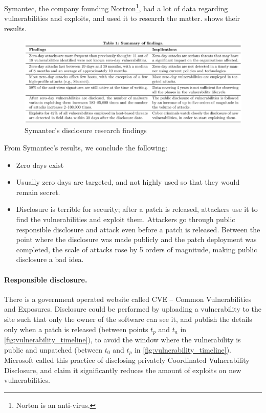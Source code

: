 Symantec, the company founding Nortron\footnote{Norton is an anti-virus.}, had a lot of data regarding vulnerabilities and exploits, and used it to research the matter.  shows their results.

\begin{figure}[!ht]
    \centering
    \includegraphics[width=\textwidth]{images/Disclosure_Research_Findings.PNG}
    \caption{Symantec's disclosure research findings}
    \label{fig:disclosure_research_findings}
\end{figure}


From Symantec's results, we conclude the following:


\begin{itemize}
    \item Zero days exist
    \item Usually zero days are targeted, and not highly used so that they would remain secret.
    \item Disclosure is terrible for security; after a patch is released, attackers use it to find the vulnerabilities and exploit them. Attackers go through public responsible disclosure and attack even before a patch is released. Between the point where the disclosure was made publicly and the patch deployment was completed, the scale of attacks rose by 5 orders of magnitude, making public disclosure a bad idea.
\end{itemize}


\paragraph{Responsible disclosure.} There is a government operated website called CVE – Common Vulnerabilities and Exposures. Disclosure could be performed by uploading a vulnerability to the site such that only the owner of the software can see it, and publish the details only when a patch is released (between points $t_p$ and $t_a$ in \cref{fig:vulnerability_timeline}), to avoid the window where the vulnerability is public and unpatched (between $t_0$ and $t_p$ in \cref{fig:vulnerability_timeline}). Microsoft called this practice of disclosing privately Coordinated Vulnerability Disclosure, and claim it significantly reduces the amount of exploits on new vulnerabilities\cite{CVD}.


